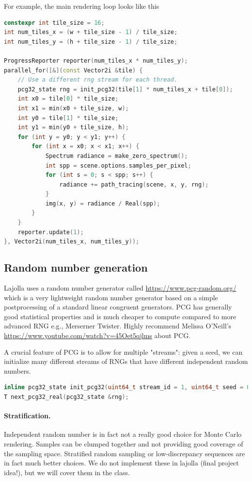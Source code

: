 \documentclass{article}
\begin{document}
For example, the main rendering loop looks like this
\begin{lstlisting}[language=c++]
constexpr int tile_size = 16;
int num_tiles_x = (w + tile_size - 1) / tile_size;
int num_tiles_y = (h + tile_size - 1) / tile_size;

ProgressReporter reporter(num_tiles_x * num_tiles_y);
parallel_for([&](const Vector2i &tile) {
    // Use a different rng stream for each thread.
    pcg32_state rng = init_pcg32(tile[1] * num_tiles_x + tile[0]);
    int x0 = tile[0] * tile_size;
    int x1 = min(x0 + tile_size, w);
    int y0 = tile[1] * tile_size;
    int y1 = min(y0 + tile_size, h);
    for (int y = y0; y < y1; y++) {
        for (int x = x0; x < x1; x++) {
            Spectrum radiance = make_zero_spectrum();
            int spp = scene.options.samples_per_pixel;
            for (int s = 0; s < spp; s++) {
                radiance += path_tracing(scene, x, y, rng);
            }
            img(x, y) = radiance / Real(spp);
        }
    }
    reporter.update(1);
}, Vector2i(num_tiles_x, num_tiles_y));
\end{lstlisting}

\subsection{Random number generation}
Lajolla uses a random number generator called \href{PCG}{https://www.pcg-random.org/} which is a very lightweight random number generator based on a simple postprocessing of a standard linear congruent generators. PCG has generally good statistical properties and is much cheaper to compute compared to more advanced RNG e.g., Merserner Twister. Highly recommend Melissa O'Neill's \href{talk}{https://www.youtube.com/watch?v=45Oet5qjlms} about PCG.

A crucial feature of PCG is to allow for multiple "streams": given a seed, we can initialize many different streams of RNGs that have different independent random numbers.

\begin{lstlisting}[language=c++]
inline pcg32_state init_pcg32(uint64_t stream_id = 1, uint64_t seed = 0x853c49e6748fea9bULL);
T next_pcg32_real(pcg32_state &rng);
\end{lstlisting}

\paragraph{Stratification.} Independent random number is in fact not a really good choice for Monte Carlo rendering. Samples can be clumped together and not providing good coverage of the sampling space. Stratified random sampling or low-discrepancy sequences are in fact much better choices. We do not implement these in lajolla (final project idea!), but we will cover them in the class.
\end{document}
